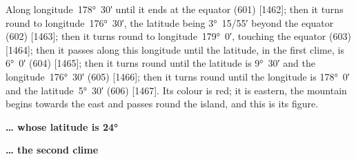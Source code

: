 \documentclass[11pt]{article}
\newcommand{\Pg}[1]{\marginpar{\footnotesize #1}}
\begin{document}
\par{}\par

\Pg{p. 43}Along longitude~178°~30′ until it ends at the equator (601) [1462]; then it turns round to longitude~176°~30′, the latitude being 3°~15/55′ beyond the equator (602) [1463]; then it turns round to longitude~179°~0′, touching the equator (603) [1464]; then it passes along this longitude until the latitude, in the first clime, is 6°~0′ (604) [1465]; then it turns round until the latitude is 9°~30′ and the longitude~176°~30′ (605) [1466]; then it turns round until the longitude is 178°~0′ and the latitude~5°~30′ (606) [1467]. Its colour is red; it is eastern, the mountain begins towards the east and passes round the island, and this is its figure.

\par\medskip\begin{center}\bfseries … whose latitude is 24°\end{center}\par

\par\medskip\begin{center}\bfseries … the second clime\end{center}\par

\par{}\par

\par{}\par
\end{document}
